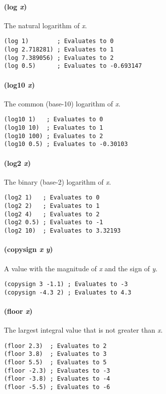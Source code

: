 \documentclass[twoside=false, numbers=noenddot]{scrbook}
\begin{document}
\paragraph{(log \emph{x})}
The natural logarithm of \emph{x}.

\begin{verbatim}
(log 1)        ; Evaluates to 0
(log 2.718281) ; Evaluates to 1
(log 7.389056) ; Evaluates to 2
(log 0.5)      ; Evaluates to -0.693147
\end{verbatim}

\paragraph{(log10 \emph{x})}
The common (base-10) logarithm of \emph{x}.

\begin{verbatim}
(log10 1)   ; Evaluates to 0
(log10 10)  ; Evaluates to 1
(log10 100) ; Evaluates to 2
(log10 0.5) ; Evaluates to -0.30103
\end{verbatim}

\paragraph{(log2 \emph{x})}
The binary (base-2) logarithm of \emph{x}.

\begin{verbatim}
(log2 1)   ; Evaluates to 0
(log2 2)   ; Evaluates to 1
(log2 4)   ; Evaluates to 2
(log2 0.5) ; Evaluates to -1
(log2 10)  ; Evaluates to 3.32193
\end{verbatim}

\paragraph{(copysign \emph{x} \emph{y})}
A value with the magnitude of \emph{x} and the sign of \emph{y}.

\begin{verbatim}
(copysign 3 -1.1) ; Evaluates to -3
(copysign -4.3 2) ; Evaluates to 4.3
\end{verbatim}

\paragraph{(floor \emph{x})}
The largest integral value that is not greater than \emph{x}.

\begin{verbatim}
(floor 2.3)  ; Evaluates to 2
(floor 3.8)  ; Evaluates to 3
(floor 5.5)  ; Evaluates to 5
(floor -2.3) ; Evaluates to -3
(floor -3.8) ; Evaluates to -4
(floor -5.5) ; Evaluates to -6
\end{verbatim}
\end{document}
